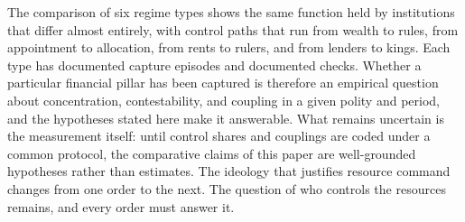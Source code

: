 \documentclass[11pt,letterpaper]{article}
\theoremstyle{definition}
\theoremstyle{remark}
\begin{document}
The comparison of six regime types shows the same function held by institutions that differ almost entirely, with control paths that run from wealth to rules, from appointment to allocation, from rents to rulers, and from lenders to kings. Each type has documented capture episodes and documented checks. Whether a particular financial pillar has been captured is therefore an empirical question about concentration, contestability, and coupling in a given polity and period, and the hypotheses stated here make it answerable. What remains uncertain is the measurement itself: until control shares and couplings are coded under a common protocol, the comparative claims of this paper are well-grounded hypotheses rather than estimates. The ideology that justifies resource command changes from one order to the next. The question of who controls the resources remains, and every order must answer it.
\end{document}
